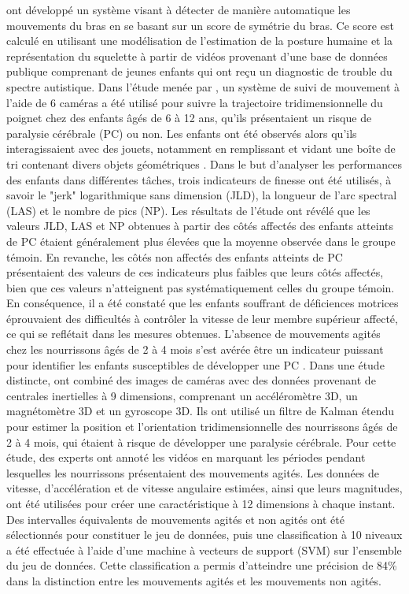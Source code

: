 \documentclass[8pt]{article}
\begin{document}
\textcite{muty_detecting_2016} ont développé un système visant à détecter de manière automatique les mouvements du bras en se basant sur un score de symétrie du bras. Ce score est calculé en utilisant une modélisation de l'estimation de la posture humaine et la représentation du squelette à partir de vidéos provenant d'une base de données publique comprenant de jeunes enfants qui ont reçu un diagnostic de trouble du spectre autistique. Dans l'étude menée par \textcite{quijano-gonzalez_upper_2014}, un système de suivi de mouvement à l'aide de 6 caméras a été utilisé pour suivre la trajectoire tridimensionnelle du poignet chez des enfants âgés de 6 à 12 ans, qu'ils présentaient un risque de paralysie cérébrale (PC) ou non. Les enfants ont été observés alors qu'ils interagissaient avec des jouets, notamment en remplissant et vidant une boîte de tri contenant divers objets géométriques \cite{klein_instrumented_2011}. Dans le but d'analyser les performances des enfants dans différentes tâches, trois indicateurs de finesse ont été utilisés, à savoir le "jerk" logarithmique sans dimension (JLD), la longueur de l'arc spectral (LAS) et le nombre de pics (NP). Les résultats de l'étude ont révélé que les valeurs JLD, LAS et NP obtenues à partir des côtés affectés des enfants atteints de PC étaient généralement plus élevées que la moyenne observée dans le groupe témoin. En revanche, les côtés non affectés des enfants atteints de PC présentaient des valeurs de ces indicateurs plus faibles que leurs côtés affectés, bien que ces valeurs n'atteignent pas systématiquement celles du groupe témoin. En conséquence, il a été constaté que les enfants souffrant de déficiences motrices éprouvaient des difficultés à contrôler la vitesse de leur membre supérieur affecté, ce qui se reflétait dans les mesures obtenues. L'absence de mouvements agités chez les nourrissons âgés de 2 à 4 mois s'est avérée être un indicateur puissant pour identifier les enfants susceptibles de développer une PC \cite{adde_general_2007}. Dans une étude distincte, \textcite{machireddy_videoimu_2017} ont combiné des images de caméras avec des données provenant de centrales inertielles à 9 dimensions, comprenant un accéléromètre 3D, un magnétomètre 3D et un gyroscope 3D. Ils ont utilisé un filtre de Kalman étendu pour estimer la position et l'orientation tridimensionnelle des nourrissons âgés de 2 à 4 mois, qui étaient à risque de développer une paralysie cérébrale. Pour cette étude, des experts ont annoté les vidéos en marquant les périodes pendant lesquelles les nourrissons présentaient des mouvements agités. Les données de vitesse, d'accélération et de vitesse angulaire estimées, ainsi que leurs magnitudes, ont été utilisées pour créer une caractéristique à 12 dimensions à chaque instant. Des intervalles équivalents de mouvements agités et non agités ont été sélectionnés pour constituer le jeu de données, puis une classification à 10 niveaux a été effectuée à l'aide d'une machine à vecteurs de support (SVM) sur l'ensemble du jeu de données. Cette classification a permis d'atteindre une précision de 84\% dans la distinction entre les mouvements agités et les mouvements non agités.\\
\end{document}
